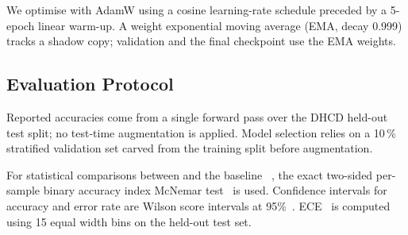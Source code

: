 We optimise with AdamW using a cosine learning-rate schedule preceded by a 5-epoch linear warm-up. A weight exponential moving average (EMA, decay 0.999) tracks a shadow copy; validation and the final checkpoint use the EMA weights.

\subsection{Evaluation Protocol}

Reported accuracies come from a single forward pass over the DHCD held-out test split; no test-time augmentation is applied. Model selection relies on a 10\,\% stratified validation set carved from the training split before augmentation.

For statistical comparisons between \modelname{} and the baseline ~\cite{malla2025}, the exact two-sided per-sample binary accuracy index McNemar test~\cite{mcnemar1947} is used. Confidence intervals for accuracy and error rate are Wilson score intervals at 95\%~\cite{wilson1927}. ECE~\cite{guo2017calibration} is computed using 15 equal width bins on the held-out test set.